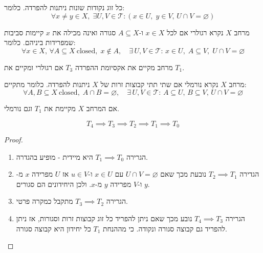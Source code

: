 \documentclass{tstextbook}
\begin{document}
\begin{definition}
כל זוג נקודות שונות ניתנות להפרדה. כלומר:
$$\forall x\neq y\in X,\;\exists U,V\in{\mathcal{T}}:\left(x\in U,\;y\in V,\,U\cap V=\varnothing \right)$$

\end{definition}
\begin{definition}
מרחב \(X\) נקרא רגולרי אם לכל \(x \in X\) ו-\(A \subseteq X\) סגורה ואינה מכילה את \(x\) קיימות סביבות שמפרידות ביניהם. כלומר:
$$\forall x\in X,\,\forall A\subseteq X{\mathrm{~closed}},\;x\notin A,\quad\exists\,U,V\in{\mathcal{T}}:\,x\in U,\;A\subseteq V,\;U\cap V=\varnothing$$

\end{definition}
\begin{definition}
מרחב מקיים את אקסיומת ההפרדה \(T_{3}\) אם רגולרי ומקיים את \(T_{1}\).

\end{definition}
\begin{definition}
מרחב \(X\) נקרא נורמלי אם שתי תתי קבוצות זרות של \(X\) ניתנות להפרדה. כלומר מתקיים:
$$\forall A,B\subseteq X{\mathrm{~closed}},\;A\cap B=\varnothing,\quad\exists\,U,V\in{\mathcal{T}}:\,A\subseteq U,\,B\subseteq V,\,U\cap V=\varnothing$$

\end{definition}
\begin{definition}
אם המרחב \(X\) מקיימת את \(T_{1}\) וגם נורמלי.

\end{definition}
\begin{proposition}
$$T_{4}\implies T_{3}\implies T_{2}\implies T_{1}\implies T_{0}$$

\end{proposition}
\begin{proof}
  \begin{enumerate}
    \item הגרירה \(T_{1}\implies T_{0}\) היא מיידית - מופיע בהגדרה. 


    \item הגדירה \(T_{2}\implies T_{1}\) נובעת מכך שאם \(U\cap V=\varnothing\) עם \(x \in U\) ו-\(u \in V\) אז \(U\) מפרידה \(x\) מ-\(y\) ו-\(V\) מפרידה \(y\) מ-\(x\). ולכן היחידונים הם סגורים. 


    \item הגרירה \(T_{3}\implies T_{2}\) מתקבל כמקרה פרטי. 


    \item הגרירה \(T_{4}\implies T_{3}\) נובע מכך שאם ניתן להפריד כל זוג קבוצות זרות וסגורות, אז ניתן להפריד גם קבוצה סגורה ונקודה. כי מההנחת \(T_{1}\) כל יחידון היא קבוצה סגורה. 


  \end{enumerate}
\end{proof}
\end{document}
